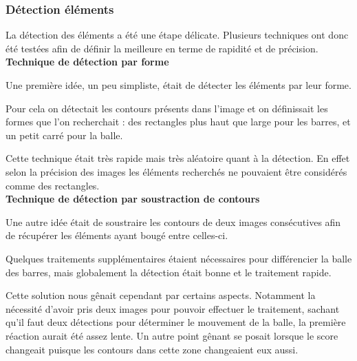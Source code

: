 \subsubsection{Détection éléments}
\label{subs:Détection éléments}
  \par La détection des éléments a été une étape délicate.
  Plusieurs techniques ont donc été testées afin de définir la meilleure en terme de rapidité et de précision.\\

  \textbf{Technique de détection par forme}
    \par Une première idée, un peu simpliste, était de détecter les éléments par leur forme.
    \par Pour cela on détectait les contours présents dans l'image et on définissait les formes que l'on recherchait : des rectangles plus haut que large pour les barres, et un petit carré pour la balle.
    \par Cette technique était très rapide mais très aléatoire quant à la détection.
    En effet selon la précision des images les éléments recherchés ne pouvaient être considérés comme des rectangles.\\

  \textbf{Technique de détection par soustraction de contours}
    \par Une autre idée était de soustraire les contours de deux images consécutives afin de récupérer les éléments ayant bougé entre celles-ci.
    \par Quelques traitements supplémentaires étaient nécessaires pour différencier la balle des barres, mais globalement la détection était bonne et le traitement rapide.
    \par Cette solution nous gênait cependant par certains aspects.
    Notamment la nécessité d'avoir pris deux images pour pouvoir effectuer le traitement, sachant qu'il faut deux détections pour déterminer le mouvement de la balle, la première réaction aurait été assez lente.
    Un autre point gênant se posait lorsque le score changeait puisque les contours dans cette zone changeaient eux aussi.\\

